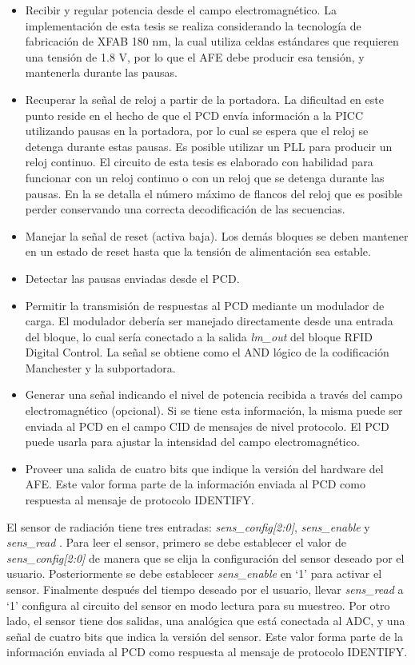 \documentclass[a4paper, twoside, 11pt]{report}
\begin{document}
\begin{itemize}
  \item Recibir y regular potencia desde el campo electromagnético. La implementación de esta tesis se realiza considerando la tecnología de fabricación de XFAB 180 nm, la cual utiliza celdas estándares que requieren una tensión de 1.8 V, por lo que el AFE debe producir esa tensión, y mantenerla durante las pausas.
  \item Recuperar la señal de reloj a partir de la portadora. La dificultad en este punto reside en el hecho de que el PCD envía información a la PICC utilizando pausas en la portadora, por lo cual se espera que el reloj se detenga durante estas pausas. Es posible utilizar un PLL para producir un reloj continuo. El circuito de esta tesis es elaborado con habilidad para funcionar con un reloj continuo o con un reloj que se detenga durante las pausas. En la  se detalla el número máximo de flancos del reloj que es posible perder conservando una correcta decodificación de las secuencias.
  \item Manejar la señal de reset (activa baja). Los demás bloques se deben mantener en un estado de reset hasta que la tensión de alimentación sea estable.
  \item Detectar las pausas enviadas desde el PCD.
  \item Permitir la transmisión de respuestas al PCD mediante un modulador de carga. El modulador debería ser manejado directamente desde una entrada del bloque, lo cual sería conectado a la salida \textit{lm\_out} del bloque RFID Digital Control. La señal se obtiene como el AND lógico de la codificación Manchester y la subportadora.
  \item Generar una señal indicando el nivel de potencia recibida a través del campo electromagnético (opcional). Si se tiene esta información, la misma puede ser enviada al PCD en el campo CID de mensajes de nivel protocolo. El PCD puede usarla para ajustar la intensidad del campo electromagnético.
  \item Proveer una salida de cuatro bits que indique la versión del hardware del AFE. Este valor forma parte de la información enviada al PCD como respuesta al mensaje de protocolo IDENTIFY.
\end{itemize}

El sensor de radiación tiene tres entradas: \textit{sens\_config[2:0]}, \textit{sens\_enable} y \textit{sens\_read} . Para leer el sensor, primero se debe establecer el valor de \textit{sens\_config[2:0]} de manera que se elija la configuración del sensor deseado por el usuario. Posteriormente se debe establecer \textit{sens\_enable} en ‘1’ para activar el sensor. Finalmente después del tiempo deseado por el usuario, llevar \textit{sens\_read} a ‘1’ configura al circuito del sensor en modo lectura para su muestreo. Por otro lado, el sensor tiene dos salidas, una analógica que está conectada al ADC, y una señal de cuatro bits que indica la versión del sensor. Este valor forma parte de la información enviada al PCD como respuesta al mensaje de protocolo IDENTIFY.
\end{document}
